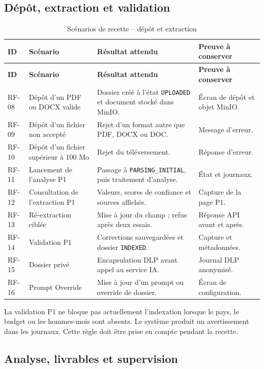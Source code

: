 \subsection{Dépôt, extraction et validation}

\begin{longtable}{p{1.5cm}p{4.2cm}p{5.3cm}p{3cm}}
\caption{Scénarios de recette -- dépôt et extraction}
\label{tab:recette-extraction} \\
\toprule
\textbf{ID} & \textbf{Scénario} & \textbf{Résultat attendu} & \textbf{Preuve à conserver} \\
\midrule
\endfirsthead
\toprule
\textbf{ID} & \textbf{Scénario} & \textbf{Résultat attendu} & \textbf{Preuve à conserver} \\
\midrule
\endhead
RF-08 & Dépôt d'un PDF ou DOCX valide & Dossier créé à l'état \texttt{UPLOADED} et document stocké dans MinIO. & Écran de dépôt et objet MinIO. \\
RF-09 & Dépôt d'un fichier non accepté & Rejet d'un format autre que PDF, DOCX ou DOC. & Message d'erreur. \\
RF-10 & Dépôt d'un fichier supérieur à 100 Mo & Rejet du téléversement. & Réponse d'erreur. \\
RF-11 & Lancement de l'analyse P1 & Passage à \texttt{PARSING\_INITIAL}, puis traitement d'analyse. & État et journaux. \\
RF-12 & Consultation de l'extraction P1 & Valeurs, scores de confiance et sources affichés. & Capture de la page P1. \\
RF-13 & Ré-extraction ciblée & Mise à jour du champ ; refus après deux essais. & Réponse API avant et après. \\
RF-14 & Validation P1 & Corrections sauvegardées et dossier \texttt{INDEXED}. & Capture et métadonnées. \\
RF-15 & Dossier privé & Encapsulation DLP avant appel au service IA. & Journal DLP anonymisé. \\
RF-16 & Prompt Override & Mise à jour d'un prompt ou override de dossier. & Écran de configuration. \\
\bottomrule
\end{longtable}

La validation P1 ne bloque pas actuellement l'indexation lorsque le pays, le budget ou les hommes-mois sont absents. Le système produit un avertissement dans les journaux. Cette règle doit être prise en compte pendant la recette.

\subsection{Analyse, livrables et supervision}

